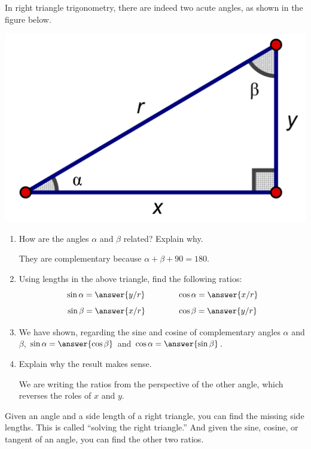 \documentclass[nooutcomes]{ximera}
\begin{document}
\begin{problem}
In right triangle trigonometry, there are indeed two acute angles, as shown in the figure below.
\begin{image}
\includegraphics[scale=0.8]{rightTriangle2.png}
\end{image}
\begin{enumerate}
\item How are the angles $\alpha$ and $\beta$ related?  Explain why.  \begin{hint}They are complementary because $\alpha+\beta+90=180$.\end{hint}
\item Using lengths in the above triangle, find the following ratios:    
\[
\sin\alpha = \answer{y/r} \qquad\qquad \cos\alpha = \answer{x/r}
\]
\[
\sin\beta = \answer{x/r} \qquad\qquad \cos\beta = \answer{y/r}
\]
\item We have shown, regarding the sine and cosine of complementary angles $\alpha$ and $\beta$, $\sin\alpha=\answer{\cos\beta}$ 
and $\cos\alpha = \answer{\sin\beta}$.  
\item Explain why the result makes sense.  \begin{hint}We are writing the ratios from the perspective of the other angle, which reverses 
the roles of $x$ and $y$.\end{hint}
\end{enumerate}
\end{problem}

Given an angle and a side length of a right triangle, you can find the missing side lengths.  This is called ``solving the right triangle.''    
And given the sine, cosine, or tangent of an angle, you can find the other two ratios. 
\end{document}
